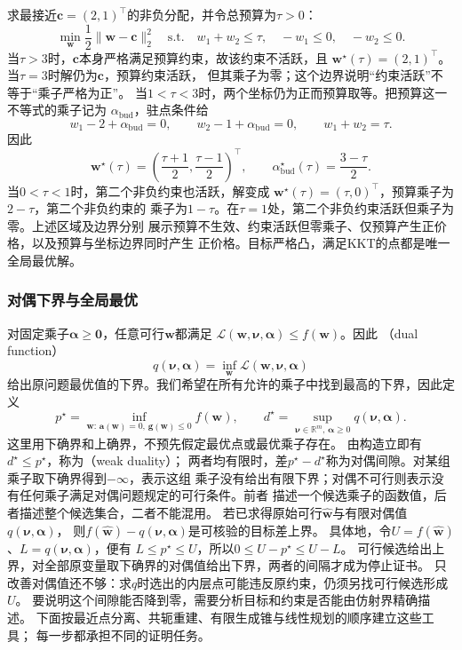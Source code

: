 \begin{example}
\label{ex:opt-kkt-budget}
求最接近$\bm{c}=(2,1)^{\top}$的非负分配，并令总预算为$\tau>0$：
\[
  \min_{\bm{w}}\frac12\lVert\bm{w}-\bm{c}\rVert_2^2
  \quad\text{s.t.}\quad
  w_1+w_2\leq\tau,\quad -w_1\leq0,\quad -w_2\leq0.
\]
当$\tau>3$时，$\bm{c}$本身严格满足预算约束，故该约束不活跃，且
$\bm{w}^{\star}(\tau)=(2,1)^{\top}$。当$\tau=3$时解仍为$\bm{c}$，预算约束活跃，
但其乘子为零；这个边界说明“约束活跃”不等于“乘子严格为正”。
当$1<\tau<3$时，两个坐标仍为正而预算取等。把预算这一不等式的乘子记为
$\alpha_{\mathrm{bud}}$，驻点条件给
\[
  w_1-2+\alpha_{\mathrm{bud}}=0,\qquad
  w_2-1+\alpha_{\mathrm{bud}}=0,\qquad
  w_1+w_2=\tau.
\]
因此
\[
  \bm{w}^{\star}(\tau)
  =\left(\frac{\tau+1}{2},\frac{\tau-1}{2}\right)^{\top},
  \qquad
  \alpha_{\mathrm{bud}}^{\star}(\tau)=\frac{3-\tau}{2}.
\]
当$0<\tau<1$时，第二个非负约束也活跃，解变成
$\bm{w}^{\star}(\tau)=(\tau,0)^{\top}$，预算乘子为$2-\tau$，第二个非负约束的
乘子为$1-\tau$。在$\tau=1$处，第二个非负约束活跃但乘子为零。上述区域及边界分别
展示预算不生效、约束活跃但零乘子、仅预算产生正价格，以及预算与坐标边界同时产生
正价格。目标严格凸，满足KKT的点都是唯一全局最优解。
\end{example}

\subsubsection{对偶下界与全局最优}
\label{sec:opt-duality}
\label{sec:opt-affine-certificates}

对固定乘子$\bm{\alpha}\geq\bm{0}$，任意可行$\bm{w}$都满足
$\mathcal{L}(\bm{w},\bm{\nu},\bm{\alpha})\leq f(\bm{w})$。因此
（dual function）
\[
  q(\bm{\nu},\bm{\alpha})
  =\inf_{\bm{w}}\mathcal{L}(\bm{w},\bm{\nu},\bm{\alpha})
\]
给出原问题最优值的下界。我们希望在所有允许的乘子中找到最高的下界，因此定义
\[
 p^\star=\inf_{\bm w:\,\bm a(\bm w)=0,\,\bm g(\bm w)\leq0}f(\bm w),\qquad
 d^\star=\sup_{\bm\nu\in\mathbb R^m,\,\bm\alpha\geq0}q(\bm\nu,\bm\alpha).
\]
这里用下确界和上确界，不预先假定最优点或最优乘子存在。
由构造立即有$d^{\star}\leq p^{\star}$，称为（weak duality）；
两者均有限时，差$p^{\star}-d^{\star}$称为对偶间隙。对某组乘子取下确界得到$-\infty$，表示这组
乘子没有给出有限下界；对偶不可行则表示没有任何乘子满足对偶问题规定的可行条件。前者
描述一个候选乘子的函数值，后者描述整个候选集合，二者不能混用。
若已求得原始可行$\widehat{\bm w}$与有限对偶值$q(\bm\nu,\bm\alpha)$，
则$f(\widehat{\bm w})-q(\bm\nu,\bm\alpha)$是可核验的目标差上界。
具体地，令$U=f(\widehat{\bm w})$、$L=q(\bm\nu,\bm\alpha)$，便有
$L\leq p^\star\leq U$，所以$0\leq U-p^\star\leq U-L$。
可行候选给出上界，对全部原变量取下确界的对偶值给出下界，两者的间隔才成为停止证书。
只改善对偶值还不够：求$q$时选出的内层点可能违反原约束，仍须另找可行候选形成$U$。
要说明这个间隙能否降到零，需要分析目标和约束是否能由仿射界精确描述。
下面按最近点分离、共轭重建、有限生成锥与线性规划的顺序建立这些工具；
每一步都承担不同的证明任务。

